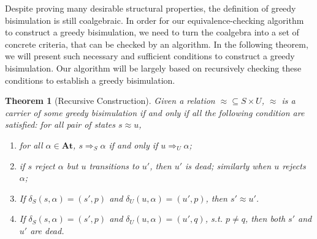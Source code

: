 \documentclass[conference]{IEEEtran}
\newtheorem{theorem}{Theorem}
\newcommand{\At}{\mathbf{At}}
\newcommand{\transAcc}[2]{⇒_{#1} #2}
\begin{document}
Despite proving many desirable structural properties, the definition of greedy bisimulation is still coalgebraic.
In order for our equivalence-checking algorithm to construct a greedy bisimulation, we need to turn the coalgebra into a set of concrete criteria, that can be checked by an algorithm.
In the following theorem, we will present such necessary and sufficient conditions to construct a greedy bisimulation.
Our algorithm will be largely based on recursively checking these conditions to establish a greedy bisimulation.

\begin{theorem}[Recursive Construction]\label{thm:recursive-construction}
    Given a relation \({≈} ⊆ S × U\), \(≈\) is a carrier of some greedy bisimulation if and only if all the following condition are satisfied: for all pair of states \(s ≈ u\),
    \begin{enumerate}
        \item\label{itm:acc-condition} for all \(α ∈ \At\), 
        \(s \transAcc{S}{α}\) if and only if \(u \transAcc{U}{α}\);
        \item\label{itm:rej-or-dead} if \(s\) reject \(α\) but \(u\) transitions to \(u'\), then \(u'\) is dead; similarly when \(u\) rejects \(α\);  
        \item\label{itm:transition-bisim} If \(δ_{S}(s, α) = (s', p)\) and \(δ_{U}(u, α) = (u', p)\), then \(s' ≈ u'\).
        \item\label{itm:transition-dead} If \(δ_{S}(s, α) = (s', p)\) and \(δ_{U}(u, α) = (u', q)\), s.t. \(p ≠ q\), then both \(s'\) and \(u'\) are dead.
    \end{enumerate}
\end{theorem}
\end{document}

